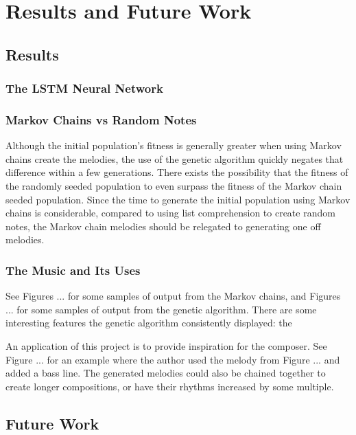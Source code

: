 \chapter{Results and Future Work} \label{results_future}

\section{Results} \label{results}

\subsection{The LSTM Neural Network}


\subsection{Markov Chains vs Random Notes}
Although the initial population's fitness is generally greater when using Markov chains create the melodies, the use of the genetic algorithm quickly negates that difference within a few generations.
There exists the possibility that the fitness of the randomly seeded population to even surpass the fitness of the Markov chain seeded population.
Since the time to generate the initial population using Markov chains is considerable, compared to using list comprehension to create random notes, the Markov chain melodies should be relegated to generating one off melodies.

\subsection{The Music and Its Uses}
See Figures ... for some samples of output from the Markov chains, and Figures ... for some samples of output from the genetic algorithm.
There are some interesting features the genetic algorithm consistently displayed: the 

An application of this project is to provide inspiration for the composer.
See Figure ... for an example where the author used the melody from Figure ... and added a bass line.
The generated melodies could also be chained together to create longer compositions, or have their rhythms increased by some multiple.

\section{Future Work} \label{future}

